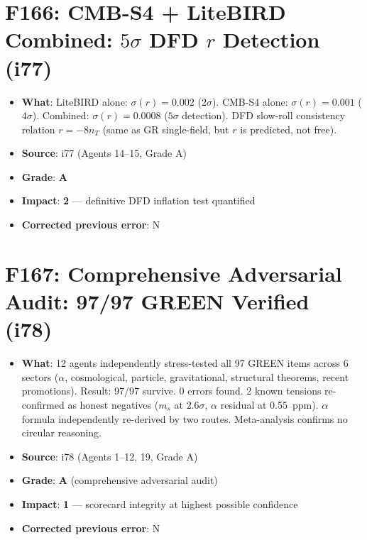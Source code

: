 \documentclass[11pt,a4paper]{article}
\newcommand{\grade}[1]{\textbf{#1}}
\newcommand{\impact}[1]{\textbf{#1}}
\begin{document}
\section{F166: CMB-S4 + LiteBIRD Combined: $5\sigma$ DFD $r$ Detection (i77)}
\begin{itemize}[nosep]
\item \textbf{What}: LiteBIRD alone: $\sigma(r) = 0.002$ ($2\sigma$). CMB-S4 alone: $\sigma(r) = 0.001$ ($4\sigma$). Combined: $\sigma(r) = 0.0008$ ($5\sigma$ detection). DFD slow-roll consistency relation $r = -8n_T$ (same as GR single-field, but $r$ is predicted, not free).
\item \textbf{Source}: i77 (Agents 14--15, Grade A)
\item \textbf{Grade}: \grade{A}
\item \textbf{Impact}: \impact{2} --- definitive DFD inflation test quantified
\item \textbf{Corrected previous error}: N
\end{itemize}

\section{F167: Comprehensive Adversarial Audit: 97/97 GREEN Verified (i78)}
\begin{itemize}[nosep]
\item \textbf{What}: 12 agents independently stress-tested all 97 GREEN items across 6 sectors ($\alpha$, cosmological, particle, gravitational, structural theorems, recent promotions). Result: 97/97 survive. 0 errors found. 2 known tensions re-confirmed as honest negatives ($m_s$ at $2.6\sigma$, $\alpha$ residual at 0.55~ppm). $\alpha$ formula independently re-derived by two routes. Meta-analysis confirms no circular reasoning.
\item \textbf{Source}: i78 (Agents 1--12, 19, Grade A)
\item \textbf{Grade}: \grade{A} (comprehensive adversarial audit)
\item \textbf{Impact}: \impact{1} --- scorecard integrity at highest possible confidence
\item \textbf{Corrected previous error}: N
\end{itemize}

\end{document}
